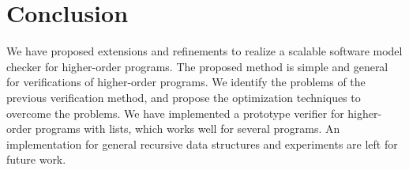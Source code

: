 \section{Conclusion}
\label{sec:conclusion}

We have proposed extensions and refinements to realize a scalable
software model checker for higher-order programs.  The proposed method
is simple and general for verifications of higher-order programs.  We
identify the problems of the previous verification method, and propose
the optimization techniques to overcome the problems.  We have
implemented a prototype verifier for higher-order programs with lists,
which works well for several programs.  An implementation for general
recursive data structures and experiments are left for future work.


